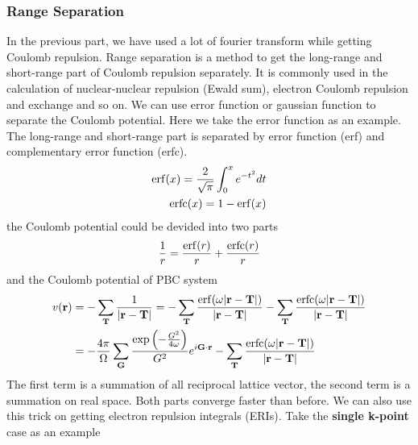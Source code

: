 \documentclass{article}
\begin{document}
        \subsubsection{Range Separation}
            In the previous part, we have used a lot of fourier transform while getting Coulomb repulsion.
            Range separation\cite{sun2020exact,Ye2021} is a method to get the long-range and short-range part of Coulomb repulsion separately.
            It is commonly used in the calculation of nuclear-nuclear repulsion (Ewald sum), 
            electron Coulomb repulsion and exchange and so on.
            We can use error function\cite{Ye2021} or gaussian function\cite{SHIMAZAKI2016132} to separate the Coulomb potential.
            Here we take the error function as an example.
            The long-range and short-range part is separated by error function (erf) and complementary error function (erfc).
            \begin{align}
                {\rm erf}(x) = \frac{2}{\sqrt{\pi}}\int_{0}^{x}e^{-t^2}dt\\
                {\rm erfc}(x) = 1-{\rm erf}(x)
            \end{align}
            the Coulomb potential could be devided into two parts
            \begin{equation}
                \frac{1}{r} = \frac{{\rm erf}(r)}{r} + \frac{{\rm erfc}(r)}{r}
            \end{equation}
            and the Coulomb potential of PBC system
            \begin{align}
                v(\textbf{r}) &= -\sum_{\textbf{T}}\frac{1}{|\textbf{r}-\textbf{T}|} = 
                -\sum_{\textbf{T}}\frac{{\rm erf}(\omega |\textbf{r}-\textbf{T}|)}{|\textbf{r}-\textbf{T}|} 
                -\sum_{\textbf{T}}\frac{{\rm erfc}(\omega |\textbf{r}-\textbf{T}|)}{|\textbf{r}-\textbf{T}|}\notag\\
                &= -\frac{4\pi}{\Omega}\sum_{\textbf{G}}\frac{\exp\left(-\frac{G^2}{4\omega}\right)}{G^2}e^{i\textbf{G}\cdot\textbf{r}} 
                -\sum_{\textbf{T}}\frac{{\rm erfc}(\omega |\textbf{r}-\textbf{T}|)}{|\textbf{r}-\textbf{T}|}
            \end{align} 
            The first term is a summation of all reciprocal lattice vector,
            the second term is a summation on real space.
            Both parts converge faster than before.
            We can also use this trick on getting electron repulsion integrals (ERIs).
            Take the \textbf{single k-point} case as an example
\end{document}
